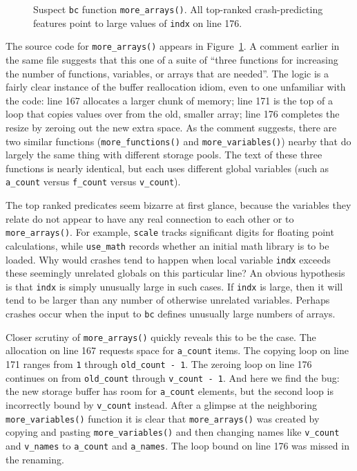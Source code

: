 \begin{figure}
  \centering
  \caption{Suspect \texttt{bc} function \texttt{more\_arrays()}.  All
  top-ranked crash-predicting features point to large values of
  \texttt{indx} on line 176.}
  \label{fig:bc:more-arrays}
\end{figure}

The source code for \texttt{more\_arrays()} appears in
Figure~\ref{fig:bc:more-arrays}.  A comment earlier in the same file
suggests that this one of a suite of ``three functions for increasing
the number of functions, variables, or arrays that are needed''.  The
logic is a fairly clear instance of the buffer reallocation idiom,
even to one unfamiliar with the code: line 167 allocates a larger
chunk of memory; line 171 is the top of a loop that copies values over
from the old, smaller array; line 176 completes the resize by zeroing
out the new extra space.  As the comment suggests, there are two
similar functions (\texttt{more\_functions()} and
\texttt{more\_variables()}) nearby that do largely the same thing with
different storage pools.  The text of these three functions is nearly
identical, but each uses different global variables (such as
\texttt{a\_count} versus \texttt{f\_count} versus \texttt{v\_count}).

The top ranked predicates seem bizarre at first glance, because the
variables they relate do not appear to have any real connection to
each other or to \texttt{more\_arrays()}.  For example, \texttt{scale}
tracks significant digits for floating point calculations, while
\texttt{use\_math} records whether an initial math library is to be
loaded.  Why would crashes tend to happen when local variable
\texttt{indx} exceeds these seemingly unrelated globals on this
particular line?  An obvious hypothesis is that \texttt{indx} is
simply unusually large in such cases.  If \texttt{indx} is large, then
it will tend to be larger than any number of otherwise unrelated
variables.  Perhaps crashes occur when the input to \texttt{bc}
defines unusually large numbers of arrays.

Closer scrutiny of \texttt{more\_arrays()} quickly reveals this to be
the case.  The allocation on line 167 requests space for
\texttt{a\_count} items.  The copying loop on line 171 ranges from
\texttt{1} through \texttt{old\_count - 1}.  The zeroing loop on line
176 continues on from \texttt{old\_count} through \texttt{v\_count -
  1}.  And here we find the bug: the new storage buffer has room for
\texttt{a\_count} elements, but the second loop is incorrectly bound
by \texttt{v\_count} instead.  After a glimpse at the
neighboring \texttt{more\_variables()} function it is clear that
\texttt{more\_arrays()} was created by copying and pasting
\texttt{more\_variables()} and then changing names like
\texttt{v\_count} and \texttt{v\_names} to \texttt{a\_count} and
\texttt{a\_names}.  The loop bound on line 176 was missed in the
renaming.

